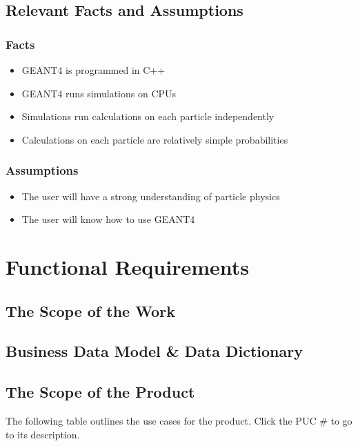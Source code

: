 \documentclass[12pt]{article}
\begin{document}
\subsection{Relevant Facts and Assumptions} %
\subsubsection{Facts}
\begin{itemize}
\item GEANT4 is programmed in C++
\item GEANT4 runs simulations on CPUs
\item Simulations run calculations on each particle independently
\item Calculations on each particle are relatively simple probabilities
\end{itemize}

\subsubsection{Assumptions}
\begin{itemize}
\item The user will have a strong understanding of particle physics
\item The user will know how to use GEANT4
\end{itemize}

\section{Functional Requirements}

\subsection{The Scope of the Work} %

\subsection{Business Data Model \& Data Dictionary} %

\subsection{The Scope of the Product}
The following table outlines the use cases for the product. Click the PUC \# to go to its description.
\end{document}

